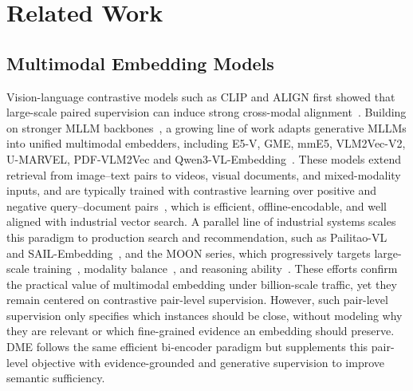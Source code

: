 \section{Related Work}
\label{sec:relatedwork}

\subsection{Multimodal Embedding Models}

Vision-language contrastive models such as CLIP and ALIGN first showed that large-scale paired supervision can induce strong cross-modal alignment~\cite{CLIP,BLIP,blip2,SigLIP,SigLIP2,ALIGN}. Building on stronger MLLM backbones~\cite{Qwen25-VL,Qwen3VL,Qwen35Blog}, a growing line of work adapts generative MLLMs into unified multimodal embedders, including E5-V, GME, mmE5, VLM2Vec-V2, U-MARVEL, PDF-VLM2Vec and Qwen3-VL-Embedding~\cite{E5-V,GME,mme5,u-marvel,VLM2VecV2, pdfvlm2vec,Qwen3VLEmbedding}. These models extend retrieval from image--text pairs to videos, visual documents, and mixed-modality inputs, and are typically trained with contrastive learning over positive and negative query--document pairs~\cite{infonce,E5,GTE}, which is efficient, offline-encodable, and well aligned with industrial vector search. 
A parallel line of industrial systems scales this paradigm to production search
and recommendation, such as Pailitao-VL and
SAIL-Embedding~\cite{PailitaoVL,SAILEmbedding}, and the MOON series, which
progressively targets large-scale training~\cite{MOON}, modality
balance~\cite{MOON2}, and reasoning ability~\cite{MOON3}. These efforts confirm
the practical value of multimodal embedding under billion-scale traffic, yet
they remain centered on contrastive pair-level supervision.
However, such pair-level supervision only specifies which instances should be close, without modeling why they are relevant or which fine-grained evidence an embedding should preserve. DME follows the same efficient bi-encoder paradigm but supplements this pair-level objective with evidence-grounded and generative supervision to improve semantic sufficiency.

